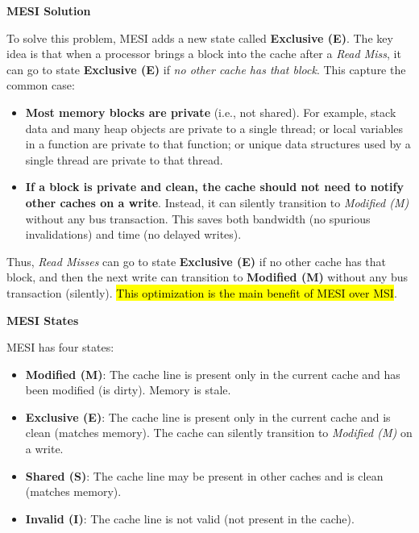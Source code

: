 \highspace
\begin{flushleft}
    \textcolor{Green3}{ \textbf{MESI Solution}}
\end{flushleft}
To solve this problem, MESI adds a new state called \textbf{Exclusive (E)}. The key idea is that when a processor brings a block into the cache after a \emph{Read Miss}, it can go to state \textbf{Exclusive (E)} if \emph{no other cache has that block}. This capture the common case:
\begin{itemize}
    \item \textbf{Most memory blocks are private} (i.e., not shared). For example, stack data and many heap objects are private to a single thread; or local variables in a function are private to that function; or unique data structures used by a single thread are private to that thread.
    \item \textbf{If a block is private and clean, the cache should not need to notify other caches on a write}. Instead, it can silently transition to \emph{Modified (M)} without any bus transaction. This saves both bandwidth (no spurious invalidations) and time (no delayed writes).
\end{itemize}
Thus, \emph{Read Misses} can go to state \textbf{Exclusive (E)} if no other cache has that block, and then the next write can transition to \textbf{Modified (M)} without any bus transaction (silently). \hl{This optimization is the main benefit of MESI over MSI}.

\highspace
\begin{flushleft}
    \textcolor{Green3}{ \textbf{MESI States}}
\end{flushleft}
MESI has four states:
\begin{itemize}
    \item \textbf{Modified (M)}: The cache line is present only in the current cache and has been modified (is dirty). Memory is stale.
    \item \textbf{Exclusive (E)}: The cache line is present only in the current cache and is clean (matches memory). The cache can silently transition to \emph{Modified (M)} on a write.
    \item \textbf{Shared (S)}: The cache line may be present in other caches and is clean (matches memory).
    \item \textbf{Invalid (I)}: The cache line is not valid (not present in the cache).
\end{itemize}

